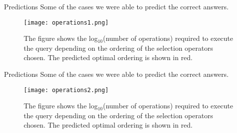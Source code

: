 \begin{frame}{Predictions}
    Some of the cases we were able to predict the correct answers.
    \begin{figure}
        \centering
        \texttt{[image: operations1.png]}\\
        \caption{The figure shows the log$_{10}$(number of operations) required to execute the query depending on the ordering of the selection operators chosen. The predicted optimal ordering is shown in red.}
        \label{fig:operations1}
    \end{figure}
\end{frame}

\begin{frame}{Predictions}
    Some of the cases we were able to predict the correct answers.
    \begin{figure}
        \centering
        \texttt{[image: operations2.png]}\\
        \caption{The figure shows the log$_{10}$(number of operations) required to execute the query depending on the ordering of the selection operators chosen. The predicted optimal ordering is shown in red.}
        \label{fig:operations2}
    \end{figure}
\end{frame}



